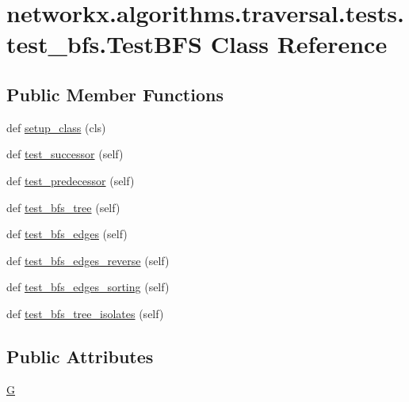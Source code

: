 \hypertarget{classnetworkx_1_1algorithms_1_1traversal_1_1tests_1_1test__bfs_1_1TestBFS}{}\section{networkx.\+algorithms.\+traversal.\+tests.\+test\+\_\+bfs.\+Test\+B\+FS Class Reference}
\label{classnetworkx_1_1algorithms_1_1traversal_1_1tests_1_1test__bfs_1_1TestBFS}
\subsection*{Public Member Functions}
\begin{DoxyCompactItemize}
\item 
def \hyperlink{classnetworkx_1_1algorithms_1_1traversal_1_1tests_1_1test__bfs_1_1TestBFS_a65bba0b3d9d43b87cd4e21385647386e}{setup\+\_\+class} (cls)
\item 
def \hyperlink{classnetworkx_1_1algorithms_1_1traversal_1_1tests_1_1test__bfs_1_1TestBFS_a30f21b2d48c8b7713230e204b62f3fe7}{test\+\_\+successor} (self)
\item 
def \hyperlink{classnetworkx_1_1algorithms_1_1traversal_1_1tests_1_1test__bfs_1_1TestBFS_aa2c41859cd38ac861502985fa21ac14c}{test\+\_\+predecessor} (self)
\item 
def \hyperlink{classnetworkx_1_1algorithms_1_1traversal_1_1tests_1_1test__bfs_1_1TestBFS_a45efead27fb20fe123721c4a93cfc0be}{test\+\_\+bfs\+\_\+tree} (self)
\item 
def \hyperlink{classnetworkx_1_1algorithms_1_1traversal_1_1tests_1_1test__bfs_1_1TestBFS_a29dc703d4ae815d9296ef9494620194e}{test\+\_\+bfs\+\_\+edges} (self)
\item 
def \hyperlink{classnetworkx_1_1algorithms_1_1traversal_1_1tests_1_1test__bfs_1_1TestBFS_a39e31af3204317b1701ebe0aa3850b86}{test\+\_\+bfs\+\_\+edges\+\_\+reverse} (self)
\item 
def \hyperlink{classnetworkx_1_1algorithms_1_1traversal_1_1tests_1_1test__bfs_1_1TestBFS_a4e26bf0dd9bc4ee56c717ab9ddaffbb3}{test\+\_\+bfs\+\_\+edges\+\_\+sorting} (self)
\item 
def \hyperlink{classnetworkx_1_1algorithms_1_1traversal_1_1tests_1_1test__bfs_1_1TestBFS_a83ac89b74d6d4ab2062076cb28e9abea}{test\+\_\+bfs\+\_\+tree\+\_\+isolates} (self)
\end{DoxyCompactItemize}
\subsection*{Public Attributes}
\begin{DoxyCompactItemize}
\item 
\hyperlink{classnetworkx_1_1algorithms_1_1traversal_1_1tests_1_1test__bfs_1_1TestBFS_a54b45d2784d666212c79f37ccf4a82eb}{G}
\end{DoxyCompactItemize}


